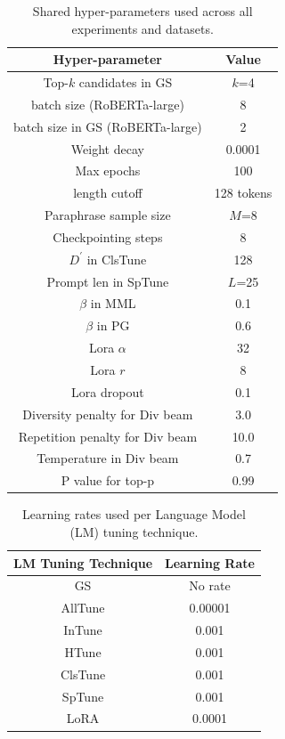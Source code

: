 \documentclass[11pt]{article}
\begin{document}
\begin{table}[t]
\centering
\caption{Shared hyper-parameters used across all experiments and datasets.}
\begin{tabular}{ c | c }
\hline
Hyper-parameter & Value\\
\hline
Top-$k$ candidates in GS & $k$=4 \\
batch size (RoBERTa-large) & 8 \\
batch size in GS (RoBERTa-large) & 2 \\
Weight decay & 0.0001 \\
Max epochs & 100 \\
length cutoff & 128 tokens \\
Paraphrase sample size & $M$=8 \\
Checkpointing steps & 8 \\
$D^{'}$ in ClsTune & 128 \\
Prompt len in SpTune & $L$=25 \\
$\beta$ in MML & 0.1 \\
$\beta$ in PG & 0.6 \\
Lora $\alpha$ & 32 \\
Lora $r$ & 8 \\
Lora dropout & 0.1 \\
Diversity penalty for Div beam & 3.0 \\
Repetition penalty for Div beam & 10.0 \\
Temperature in Div beam & 0.7 \\
P value for top-p & 0.99
\end{tabular}
\label{hyper-parameters}
\end{table}

\begin{table}[t]
\centering
\caption{Learning rates used per Language Model (LM) tuning technique.}
\begin{tabular}{ c | c }
\hline
LM Tuning Technique & Learning Rate\\
\hline
GS & No rate \\
AllTune & 0.00001 \\
InTune &  0.001 \\
HTune & 0.001 \\
ClsTune & 0.001 \\
SpTune & 0.001 \\
LoRA & 0.0001 
\end{tabular}
\label{learning-rates}
\end{table}
\end{document}
